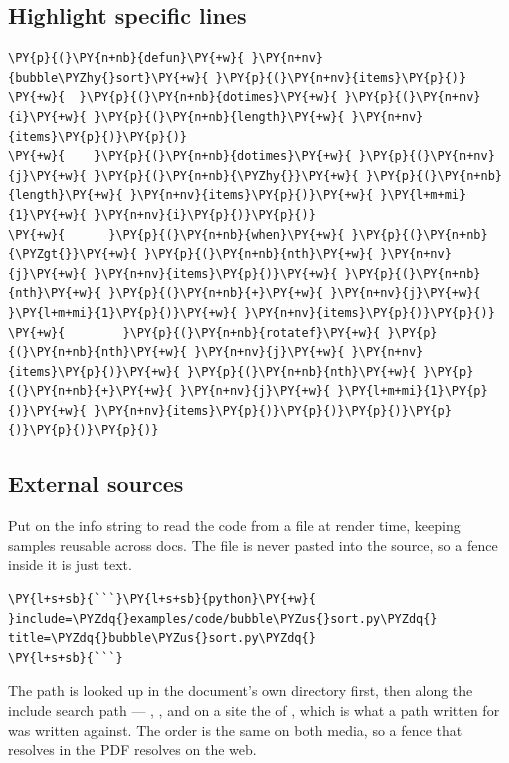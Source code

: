 \documentclass[a4paper,twoside]{article}
\begin{document}
\subsection{Highlight specific lines}
\begin{tscode}[lang=lisp, hl_lines={2-3}, engine=pygments]
\begin{Verbatim}[commandchars=\\\{\},breaklines, breakanywhere, commandchars=\\\{\},highlightlines={2-3}]
\PY{p}{(}\PY{n+nb}{defun}\PY{+w}{ }\PY{n+nv}{bubble\PYZhy{}sort}\PY{+w}{ }\PY{p}{(}\PY{n+nv}{items}\PY{p}{)}
\PY{+w}{  }\PY{p}{(}\PY{n+nb}{dotimes}\PY{+w}{ }\PY{p}{(}\PY{n+nv}{i}\PY{+w}{ }\PY{p}{(}\PY{n+nb}{length}\PY{+w}{ }\PY{n+nv}{items}\PY{p}{)}\PY{p}{)}
\PY{+w}{    }\PY{p}{(}\PY{n+nb}{dotimes}\PY{+w}{ }\PY{p}{(}\PY{n+nv}{j}\PY{+w}{ }\PY{p}{(}\PY{n+nb}{\PYZhy{}}\PY{+w}{ }\PY{p}{(}\PY{n+nb}{length}\PY{+w}{ }\PY{n+nv}{items}\PY{p}{)}\PY{+w}{ }\PY{l+m+mi}{1}\PY{+w}{ }\PY{n+nv}{i}\PY{p}{)}\PY{p}{)}
\PY{+w}{      }\PY{p}{(}\PY{n+nb}{when}\PY{+w}{ }\PY{p}{(}\PY{n+nb}{\PYZgt{}}\PY{+w}{ }\PY{p}{(}\PY{n+nb}{nth}\PY{+w}{ }\PY{n+nv}{j}\PY{+w}{ }\PY{n+nv}{items}\PY{p}{)}\PY{+w}{ }\PY{p}{(}\PY{n+nb}{nth}\PY{+w}{ }\PY{p}{(}\PY{n+nb}{+}\PY{+w}{ }\PY{n+nv}{j}\PY{+w}{ }\PY{l+m+mi}{1}\PY{p}{)}\PY{+w}{ }\PY{n+nv}{items}\PY{p}{)}\PY{p}{)}
\PY{+w}{        }\PY{p}{(}\PY{n+nb}{rotatef}\PY{+w}{ }\PY{p}{(}\PY{n+nb}{nth}\PY{+w}{ }\PY{n+nv}{j}\PY{+w}{ }\PY{n+nv}{items}\PY{p}{)}\PY{+w}{ }\PY{p}{(}\PY{n+nb}{nth}\PY{+w}{ }\PY{p}{(}\PY{n+nb}{+}\PY{+w}{ }\PY{n+nv}{j}\PY{+w}{ }\PY{l+m+mi}{1}\PY{p}{)}\PY{+w}{ }\PY{n+nv}{items}\PY{p}{)}\PY{p}{)}\PY{p}{)}\PY{p}{)}\PY{p}{)}\PY{p}{)}
\end{Verbatim}
\end{tscode}
\subsection{External sources}
Put  on the info string to read the code from a file at render time,
keeping samples reusable across docs. The file is never pasted into the source,
so a fence inside it is just text.
\begin{tscode}[lang=md, engine=pygments]
\begin{Verbatim}[commandchars=\\\{\},breaklines, breakanywhere, commandchars=\\\{\}]
\PY{l+s+sb}{```}\PY{l+s+sb}{python}\PY{+w}{ }include=\PYZdq{}examples/code/bubble\PYZus{}sort.py\PYZdq{} title=\PYZdq{}bubble\PYZus{}sort.py\PYZdq{}
\PY{l+s+sb}{```}
\end{Verbatim}
\end{tscode}
The path is looked up in the document's own directory first, then along the
include search path --- , , and on a site
the  of , which is what a path written for
 was written against. The order is the same on both media, so a fence
that resolves in the PDF resolves on the web.
\end{document}
